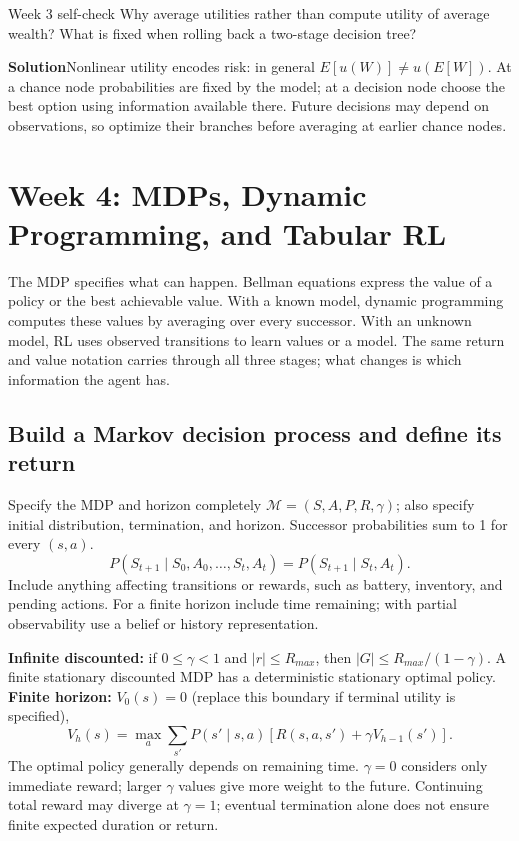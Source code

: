 \documentclass[10pt,a4paper]{article}
\newcommand{\ans}{\par\smallskip\textbf{\color{good}Solution\quad}}
\newcommand{\topic}[1]{\clearpage\section{#1}}
\begin{document}
\begin{question}{Week 3 self-check}
Why average utilities rather than compute utility of average wealth? What is fixed when rolling back a two-stage decision tree?
\ans Nonlinear utility encodes risk: in general $E[u(W)]\ne u(E[W])$. At a chance node probabilities are fixed by the model; at a decision node choose the best option using information available there. Future decisions may depend on observations, so optimize their branches before averaging at earlier chance nodes.
\end{question}

\topic{Week 4: MDPs, Dynamic Programming, and Tabular RL}



\begin{idea}
The MDP specifies what can happen. Bellman equations express the value of a policy or the best achievable value. With a known model, dynamic programming computes these values by averaging over every successor. With an unknown model, RL uses observed transitions to learn values or a model. The same return and value notation carries through all three stages; what changes is which information the agent has.
\end{idea}
\subsection{Build a Markov decision process and define its return}
\begin{card}{Specify the MDP and horizon completely}
$\mathcal M=(S,A,P,R,\gamma)$; also specify initial distribution, termination, and horizon. Successor probabilities sum to 1 for every $(s,a)$.
\[
P(S_{t+1}\mid S_0,A_0,\ldots,S_t,A_t)=P(S_{t+1}\mid S_t,A_t).
\]
Include anything affecting transitions or rewards, such as battery, inventory, and pending actions. For a finite horizon include time remaining; with partial observability use a belief or history representation.

\textbf{Infinite discounted:} if $0\le\gamma<1$ and $|r|\le R_{max}$, then $|G|\le R_{max}/(1-\gamma)$. A finite stationary discounted MDP has a deterministic stationary optimal policy.
\textbf{Finite horizon:} $V_0(s)=0$ (replace this boundary if terminal utility is specified),
\[
V_h(s)=\max_a\sum_{s'}P(s'\mid s,a)[R(s,a,s')+\gamma V_{h-1}(s')].
\]
The optimal policy generally depends on remaining time. $\gamma=0$ considers only immediate reward; larger $\gamma$ values give more weight to the future. Continuing total reward may diverge at $\gamma=1$; eventual termination alone does not ensure finite expected duration or return.
\end{card}
\end{document}
